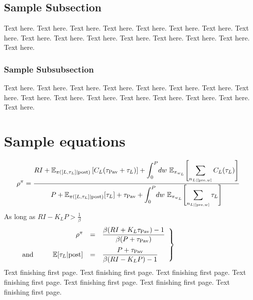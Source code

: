 \documentclass[NETN]{stjour}
\def\taupav{\tau_{\mathrm{Pav}}}
\begin{document}
\subsection{Sample Subsection}
Text here. Text here. Text here. Text here.
Text here. Text here. Text here. Text here.
Text here. Text here. Text here. Text here.
Text here. Text here. Text here. Text here.

\subsubsection{Sample Subsubsection}
Text here. Text here. Text here. Text here.
Text here. Text here. Text here. Text here.
Text here. Text here. Text here. Text here.
Text here. Text here. Text here. Text here.


\section{Sample equations}
\begin{equation}
\label{eq:rhoCHT}
\rho^{\pi}= \frac{RI + \mathbb{E}_{\pi([L,\tau_L]|\textrm{post})}
\left[C_L(\taupav+\tau_L) \right]   +
\displaystyle{\int_{0}^{P}}{dw~ \mathbb{E}_{\pi_{w_L}}}
\Biggl[\/\sum_{n_{L|[\textrm{pre},w]}}C_L(\tau_L)
\Biggr]            }      {P +
\mathbb{E}_{\pi([L,\tau_L] |\textrm{post})}[\tau_{L}] +\taupav +
\displaystyle{ \int_{0}^{P}}{dw~ \mathbb{E}_{\pi_{w_L}}}   
\Biggl[\sum_{n_{L|[\textrm{pre},w]}}\tau_L\Biggr]  
}
\end{equation}
As long as
$RI - K_LP > 
\frac{1}{\beta}$
\begin{equation}
\left.\begin{array}{lrcl}
&\rho^{\pi} &=&  \displaystyle\frac{\beta ( RI + K_L \taupav )-1} {\beta
(P+\taupav )}    \\[12pt]
\hbox{and}\hbox to .25in{\hfill}&\mathbb{E}[\tau_L | \text{post}] &=&\displaystyle \frac{P+\taupav}{\beta ( RI -
K_LP)-1}  
\label{eq:analytical_linear}
\end{array}\right\}\hbox to 1.25in{\hfill}
\end{equation} 
Text finishing first page.
Text finishing first page.
Text finishing first page.
Text finishing first page.
Text finishing first page.
Text finishing first page.
Text finishing first page.
\end{document}
